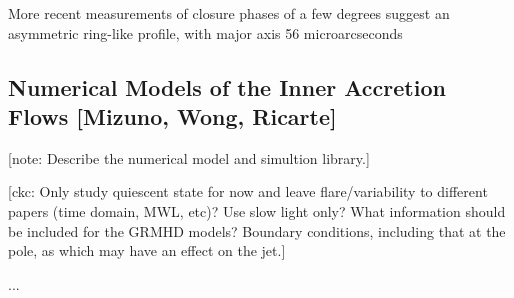 \documentclass[twocolumn,tighten,dvipsnames,linenumbers]{aastex63}
\newcommand\note[1]{{\color{OliveGreen}[note: #1]}}
\newcommand\ckc[1]{{\color{MidnightBlue}[ckc: #1]}}
\begin{document}

More recent measurements of closure phases of a few degrees \cite{Fish2016} suggest an asymmetric ring-like profile, with major axis 56 microarcseconds




\subsection{Numerical Models of the Inner Accretion Flows
  [Mizuno, Wong, Ricarte]}
\label{sec:numodels}

\note{Describe the numerical model and simultion library.}

\ckc{Only study quiescent state for now and leave flare/variability to
  different papers (time domain, MWL, etc)?
  Use slow light only?
  What information should be included for the GRMHD models?
  Boundary conditions, including that at the pole, as which may have
  an effect on the jet.}


...


\end{document}
